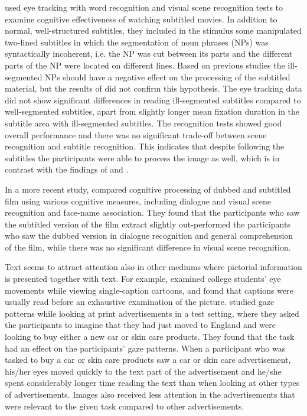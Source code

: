 \documentclass[output=paper]{langsci/langscibook}
\begin{document}
\citet{Perego2010} used eye tracking with word recognition and visual scene recognition tests to examine cognitive effectiveness of watching subtitled movies. In addition to normal, well-structured subtitles, they included in the stimulus some manipulated two-lined subtitles in which the segmentation of noun phrases (NPs) was syntactically incoherent, i.e. the NP was cut between its parts and the different parts of the NP were located on different lines. Based on previous studies \citep{Perego2008} the ill-segmented NPs should have a negative effect on the processing of the subtitled material, but the results of \citet{Perego2010} did not confirm this hypothesis. The eye tracking data did not show significant differences in reading ill-segmented subtitles compared to well-segmented subtitles, apart from slightly longer mean fixation duration in the subtitle area with ill-segmented subtitles. The recognition tests showed good overall performance and there was no significant trade-off between scene recognition and subtitle recognition. This indicates that despite following the subtitles the participants were able to process the image as well, which is in contrast with the findings of \citet{lee2013} and \citet{lavaur2011}.

In a more recent study, \citet{Perego2015} compared cognitive processing of dubbed and subtitled film using various cognitive measures, including dialogue and visual scene recognition and face-name association. They found that the participants who saw the subtitled version of the film extract slightly out-performed the participants who saw the dubbed version in dialogue recognition and general comprehension of the film, while there was no significant difference in visual scene recognition. 

Text seems to attract attention also in other mediums where pictorial information is presented together with text. For example, \citet{carroll1992} examined college students' eye movements while viewing single-caption cartoons, and found that captions were usually read before an exhaustive examination of the picture. \citet{rayner2001} studied gaze patterns while looking at print advertisements in a test setting, where they asked the participants to imagine that they had just moved to England and were looking to buy either a new car or skin care products. They found that the task had an effect on the participants' gaze patterns. When a participant who was tasked to buy a car or skin care products saw a car or skin care advertisement, his/her eyes moved quickly to the text part of the advertisement and he/she spent considerably longer time reading the text than when looking at other types of advertisements. Images also received less attention in the advertisements that were relevant to the given task compared to other advertisements.
\end{document}
